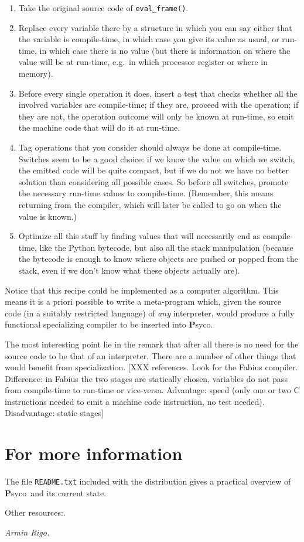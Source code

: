 \documentclass{article}
\def\Psyco{{\bf P}syco}
\def\code#1{\texttt{#1}}
\begin{document}
\begin{enumerate}
\item Take the original source code of \code{eval\_frame()}.
\item Replace every variable there by a structure in which you can say either that the variable is compile-time, in which case you give its value as usual, or run-time, in which case there is no value (but there is information on where the value will be at run-time, e.g.\ in which processor register or where in memory).
\item Before every single operation it does, insert a test that checks whether all the involved variables are compile-time; if they are, proceed with the operation; if they are not, the operation outcome will only be known at run-time, so emit the machine code that will do it at run-time.
\item Tag operations that you consider should always be done at compile-time. Switches seem to be a good choice: if we know the value on which we switch, the emitted code will be quite compact, but if we do not we have no better solution than considering all possible cases. So before all switches, promote the necessary run-time values to compile-time. (Remember, this means returning from the compiler, which will later be called to go on when the value is known.)
\item Optimize all this stuff by finding values that will necessarily end as compile-time, like the Python bytecode, but also all the stack manipulation (because the bytecode is enough to know where objects are pushed or popped from the stack, even if we don't know what these objects actually are).
\end{enumerate}

Notice that this recipe could be implemented as a computer algorithm. This means it is a priori possible to write a meta-program which, given the source code (in a suitably restricted language) of \emph{any} interpreter, would produce a fully functional specializing compiler to be inserted into \Psyco.

The most interesting point lie in the remark that after all there is no need for the source code to be that of an interpreter. There are a number of other things that would benefit from specialization. [XXX references. Look for the Fabius compiler. Difference: in Fabius the two stages are statically chosen, variables do not pass from compile-time to run-time or vice-versa. Advantage: speed (only one or two C instructions needed to emit a machine code instruction, no test needed). Disadvantage: static stages]



\section{For more information}


The file \code{README.txt} included with the distribution gives a practical overview of \Psyco\ and its current state.

Other resources:\hfill\break {}.

\hfill\emph{Armin Rigo.}
\end{document}
